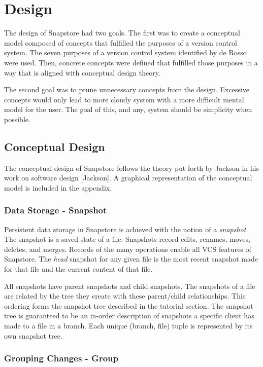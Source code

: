 \chapter{Design}

The design of Snapstore had two goals. The first was to create a conceptual model composed of concepts that fulfilled the purposes of a version control system. The seven purposes of a version control system identified by de Rosso were used. Then, concrete concepts were defined that fulfilled those purposes in a way that is aligned with conceptual design theory.

The second goal was to prune unnecessary concepts from the design. Excessive concepts would only lead to more cloudy system with a more difficult mental model for the user. The goal of this, and any, system should be simplicity when possible.

\section{Conceptual Design}

The conceptual design of Snapstore follows the theory put forth by Jackson in his work on software design [Jackson]. A graphical representation of the conceptual model is included in the appendix.

\subsection{Data Storage - Snapshot}

Persistent data storage in Snapstore is achieved with the notion of a \textit{snapshot}. The snapshot is a saved state of a file. Snapshots record edits, renames, moves, deletes, and merges. Records of the many operations enable all VCS features of Snapstore. The \textit{head} snapshot for any given file is the most recent snapshot made for that file and the current content of that file. 

All snapshots have parent snapshots and child snapshots. The snapshots of a file are related by the tree they create with these parent/child relationships. This ordering forms the snapshot tree described in the tutorial section. The snapshot tree is guaranteed to be an in-order description of snapshots a specific client has made to a file in a branch. Each unique (branch, file) tuple is represented by its own snapshot tree.

\subsection{Grouping Changes - Group}

